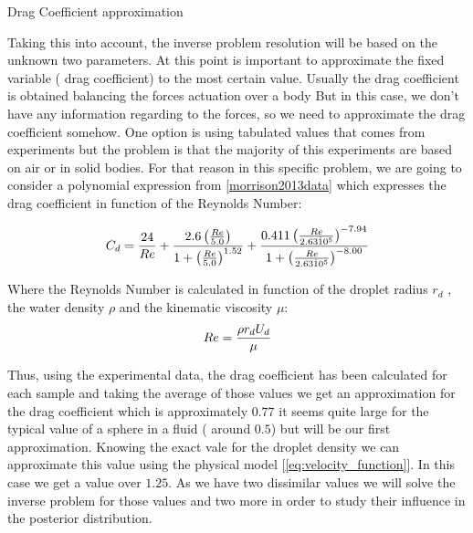 \documentclass{article}
\newcounter{subsubsubsection}[subsubsection]
\begin{document}
\begin{subsubsubsection}{Drag Coefficient approximation}

Taking this into account, the inverse problem resolution will be based on the unknown  two parameters. At this point is important to approximate the fixed variable ( drag coefficient) to the most certain value. Usually the drag coefficient is obtained balancing the forces actuation over a body But in this case, we don't have any information regarding to the forces, so we need to approximate the drag coefficient somehow. One option is using  tabulated values that comes from experiments but the problem is that  the majority of this experiments are based on air or in solid bodies. For that reason  in this specific problem, we are going to consider  a polynomial  expression from \ref{morrison2013data} which expresses the drag coefficient in function of the Reynolds Number: 

\begin{equation} \label{eq:drag_coefficient}
C_d=\frac{24}{Re}+\frac{2.6\left(\frac{Re}{5.0}\right)}{1+\left(\frac{Re}{5.0}\right)^{1.52}}+\frac{0.411\left(\frac{Re}{2.63\dot 10^5}\right)^{-7.94}}{1+\left(\frac{Re}{2.63\dot 10^5}\right)^{-8.00}}\\
\end{equation}

Where the Reynolds Number is calculated in function of the droplet radius $r_d$ , the water density $\rho$ and the kinematic viscosity $\mu$:
\begin{equation} \label{eq:Reynolds}
Re=\frac{\rho r_d U_d}{\mu}\\
\end{equation}

Thus, using the experimental data, the drag coefficient has been calculated for each sample and taking the average of those values
 we get an approximation for the drag coefficient which is approximately $0.77$ it seems quite large for the typical value of a sphere in a fluid ( around $0.5$) but will be our first approximation. Knowing the exact vale for  the droplet density we can approximate this value using the physical model [\ref{eq:velocity_function}]. In this case we get a value over $1.25$. As we have two dissimilar values we will solve the inverse problem for those values and two more in order to study their influence in the posterior distribution.
 
\end{subsubsubsection} 
 \par \noindent
 
\end{document}
